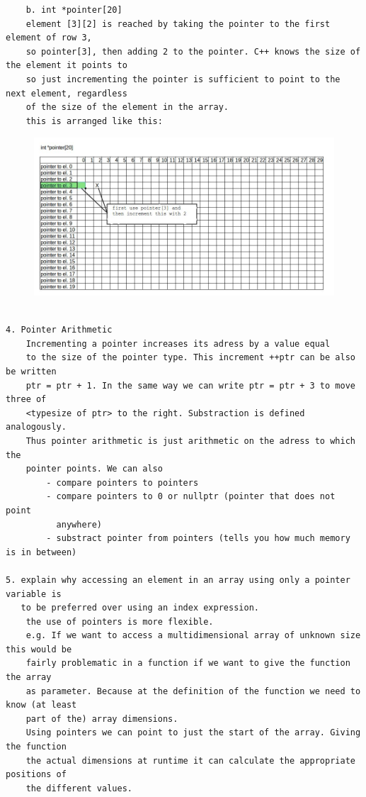 \documentclass{article}[9pt]
\begin{document}
\begin{verbatim}
    b. int *pointer[20]
    element [3][2] is reached by taking the pointer to the first element of row 3,
    so pointer[3], then adding 2 to the pointer. C++ knows the size of the element it points to
    so just incrementing the pointer is sufficient to point to the next element, regardless
    of the size of the element in the array.
    this is arranged like this:
\end{verbatim}
\begin{figure}[H]
\includegraphics[width=\textwidth]{../34/int_pointer.jpg}
\end{figure}
\begin{verbatim}
    
4. Pointer Arithmetic   
    Incrementing a pointer increases its adress by a value equal
    to the size of the pointer type. This increment ++ptr can be also be written
    ptr = ptr + 1. In the same way we can write ptr = ptr + 3 to move three of 
    <typesize of ptr> to the right. Substraction is defined analogously. 
    Thus pointer arithmetic is just arithmetic on the adress to which the
    pointer points. We can also 
        - compare pointers to pointers
        - compare pointers to 0 or nullptr (pointer that does not point
          anywhere)
        - substract pointer from pointers (tells you how much memory is in between)

5. explain why accessing an element in an array using only a pointer variable is 
   to be preferred over using an index expression.
    the use of pointers is more flexible. 
    e.g. If we want to access a multidimensional array of unknown size this would be
    fairly problematic in a function if we want to give the function the array
    as parameter. Because at the definition of the function we need to know (at least
    part of the) array dimensions. 
    Using pointers we can point to just the start of the array. Giving the function 
    the actual dimensions at runtime it can calculate the appropriate positions of 
    the different values.
    
\end{verbatim}
\end{document}
